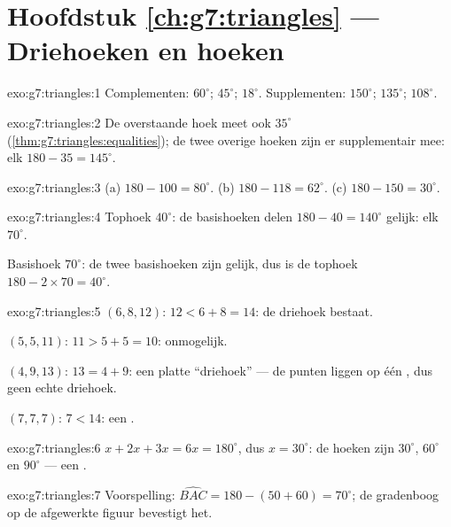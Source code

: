 \section*{Hoofdstuk \ref{ch:g7:triangles} --- Driehoeken en hoeken}

\begin{solution}{exo:g7:triangles:1}
Complementen: $60^\circ$; $45^\circ$; $18^\circ$.
Supplementen: $150^\circ$; $135^\circ$; $108^\circ$.
\end{solution}

\begin{solution}{exo:g7:triangles:2}
De overstaande hoek meet ook $35^\circ$
(\cref{thm:g7:triangles:equalities}); de twee overige hoeken zijn er supplementair
mee: elk $180 - 35 = 145^\circ$.
\end{solution}

\begin{solution}{exo:g7:triangles:3}
(a) $180 - 100 = 80^\circ$. \quad
(b) $180 - 118 = 62^\circ$. \quad
(c) $180 - 150 = 30^\circ$.
\end{solution}

\begin{solution}{exo:g7:triangles:4}
Tophoek $40^\circ$: de basishoeken delen $180 - 40 = 140^\circ$ gelijk: elk
$70^\circ$.

Basishoek $70^\circ$: de twee basishoeken zijn gelijk, dus is de tophoek
$180 - 2 \times 70 = 40^\circ$.
\end{solution}

\begin{solution}{exo:g7:triangles:5}
$(6, 8, 12)$: $12 < 6 + 8 = 14$: de driehoek bestaat.

$(5, 5, 11)$: $11 > 5 + 5 = 10$: onmogelijk.

$(4, 9, 13)$: $13 = 4 + 9$: een platte ``driehoek'' --- de punten liggen op één
, dus geen echte driehoek.

$(7, 7, 7)$: $7 < 14$: een .
\end{solution}

\begin{solution}{exo:g7:triangles:6}
$x + 2x + 3x = 6x = 180^\circ$, dus $x = 30^\circ$: de hoeken zijn $30^\circ$,
$60^\circ$ en $90^\circ$ --- een .
\end{solution}

\begin{solution}{exo:g7:triangles:7}
Voorspelling: $\widehat{BAC} = 180 - (50 + 60) = 70^\circ$; de gradenboog op de
afgewerkte figuur bevestigt het.
\end{solution}

